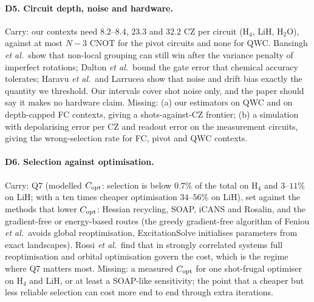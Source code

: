 \documentclass[11pt]{article}
\newcommand{\Hfour}{H$_4$}
\newcommand{\Htwo}{H$_2$O}
\begin{document}
\paragraph{D5. Circuit depth, noise and hardware.} Carry: our contexts need $8.2$--$8.4$, $23.3$ and $32.2$ CZ per circuit (\Hfour{}, LiH, \Htwo{}), against at most $N-3$ CNOT for the pivot circuits and none for QWC. Bansingh \emph{et al.}\ show that non-local grouping can still win after the variance penalty of imperfect rotations; Dalton \emph{et al.}\ bound the gate error that chemical accuracy tolerates; Haravu \emph{et al.}\ and Larrucea show that noise and drift bias exactly the quantity we threshold. Our intervals cover shot noise only, and the paper should say it makes no hardware claim. Missing: (a) our estimators on QWC and on depth-capped FC contexts, giving a shots-against-CZ frontier; (b) a simulation with depolarising error per CZ and readout error on the measurement circuits, giving the wrong-selection rate for FC, pivot and QWC contexts.

\paragraph{D6. Selection against optimisation.} Carry: Q7 (modelled $C_{\rm opt}$: selection is below $0.7\%$ of the total on \Hfour{} and $3$--$11\%$ on LiH; with a ten times cheaper optimisation $34$--$56\%$ on LiH), set against the methods that lower $C_{\rm opt}$: Hessian recycling, SOAP, iCANS and Rosalin, and the gradient-free or energy-based routes (the greedy gradient-free algorithm of Feniou \emph{et al.}\ avoids global reoptimisation, ExcitationSolve initialises parameters from exact landscapes). Rossi \emph{et al.}\ find that in strongly correlated systems full reoptimisation and orbital optimisation govern the cost, which is the regime where Q7 matters most. Missing: a measured $C_{\rm opt}$ for one shot-frugal optimiser on \Hfour{} and LiH, or at least a SOAP-like sensitivity; the point that a cheaper but less reliable selection can cost more end to end through extra iterations.
\end{document}
